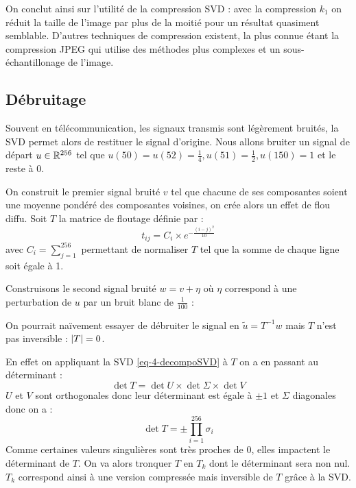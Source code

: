 		On conclut ainsi sur l'utilité de la compression SVD : avec la compression $k_1$ on réduit la taille de l'image par plus de la moitié pour un résultat quasiment semblable.
		D'autres techniques de compression existent, la plus connue étant la compression JPEG qui utilise des méthodes plus complexes et un sous-échantillonage de l'image.

	\subsection{Débruitage}

		Souvent en télécommunication, les signaux transmis sont légèrement bruités, la SVD permet alors de restituer le signal d'origine.
		Nous allons bruiter un signal de départ $u\in\mathbb{R}^{256}$ tel que $u(50)=u(52)=\frac{1}{4}, u(51)=\frac{1}{2}, u(150)=1$ et le reste à $0$.

		On construit le premier signal bruité $v$ tel que chacune de ses composantes soient une moyenne pondéré des composantes voisines, on crée alors un effet de flou diffu. Soit $T$ la matrice de floutage définie par :
		\begin{equation}
			\label{eq-4-Tfloutage}
			t_{ij} = C_i \times e^{-\frac{(i-j)^2}{10}}
		\end{equation}
		avec $C_i = \sum_{j=1}^{256}$ permettant de normaliser $T$ tel que la somme de chaque ligne soit égale à 1. 

		Construisons le second signal bruité $w = v + \eta$ où $\eta$ correspond à une perturbation de $u$ par un bruit blanc de $\frac{1}{100}$ :

		On pourrait naïvement essayer de débruiter le signal en $\tilde u	= T^{-1}w$ mais $T$ n'est pas inversible : $\lvert T \rvert=0$.

		En effet on appliquant la SVD \eqref{eq-4-decompoSVD} à $T$ on a en passant au déterminant :
		$$
			\det T = \det U \times \det \Sigma \times \det V
		$$
		$U$ et $V$ sont orthogonales donc leur déterminant est égale à $\pm1$ et $\Sigma$ diagonales donc on a :
		$$
			\det T = \pm \prod_{i=1}^{256} \sigma_i
		$$
		Comme certaines valeurs singulières sont très proches de $0$, elles impactent le déterminant de $T$. On va alors tronquer $T$ en $T_k$ dont le déterminant sera non nul. $T_k$ correspond ainsi à une version compressée mais inversible de $T$ grâce à la SVD.


